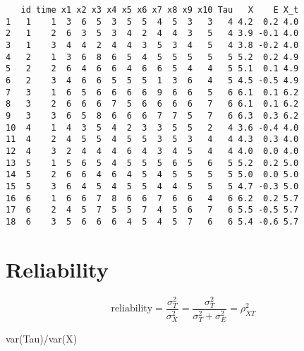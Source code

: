 \documentclass[
]{book}
\newenvironment{Shaded}{\begin{snugshade}}{\end{snugshade}}
\newcommand{\FunctionTok}[1]{\textcolor[rgb]{0.00,0.00,0.00}{#1}}
\newcommand{\NormalTok}[1]{#1}
\newcommand{\OtherTok}[1]{\textcolor[rgb]{0.56,0.35,0.01}{#1}}
\newcommand{\SpecialCharTok}[1]{\textcolor[rgb]{0.00,0.00,0.00}{#1}}
\begin{document}
\begin{verbatim}
   id time x1 x2 x3 x4 x5 x6 x7 x8 x9 x10 Tau   X    E X_t
1   1    1  3  6  5  3  5  5  4  5  3   3   4 4.2  0.2 4.0
2   1    2  6  3  5  3  4  2  4  4  3   5   4 3.9 -0.1 4.0
3   1    3  4  4  2  4  4  3  5  3  4   5   4 3.8 -0.2 4.0
4   2    1  3  6  8  6  5  4  5  5  5   5   5 5.2  0.2 4.9
5   2    2  6  4  6  6  4  6  6  5  4   4   5 5.1  0.1 4.9
6   2    3  4  6  6  5  5  5  1  3  6   4   5 4.5 -0.5 4.9
7   3    1  6  5  6  6  6  6  9  6  6   5   6 6.1  0.1 6.2
8   3    2  6  6  6  7  5  6  6  6  6   7   6 6.1  0.1 6.2
9   3    3  6  5  8  6  6  6  7  7  5   7   6 6.3  0.3 6.2
10  4    1  4  3  5  4  2  3  3  5  5   2   4 3.6 -0.4 4.0
11  4    2  4  5  5  4  5  5  3  5  3   4   4 4.3  0.3 4.0
12  4    3  2  4  4  4  6  4  3  4  5   4   4 4.0  0.0 4.0
13  5    1  5  6  5  4  5  5  5  6  5   6   5 5.2  0.2 5.0
14  5    2  6  6  4  6  4  5  4  5  5   5   5 5.0  0.0 5.0
15  5    3  6  4  5  4  5  5  4  4  5   5   5 4.7 -0.3 5.0
16  6    1  6  6  7  8  6  6  7  6  6   4   6 6.2  0.2 5.7
17  6    2  4  5  7  5  5  7  4  5  6   7   6 5.5 -0.5 5.7
18  6    3  5  6  6  6  4  5  4  5  7   6   6 5.4 -0.6 5.7
\end{verbatim}

\hypertarget{reliability}{%
\section{Reliability}\label{reliability}}

\[
\text{reliability} = \frac{\sigma^2_T}{\sigma^2_X} = \frac{\sigma^2_T}{\sigma^2_T + \sigma^2_E} = \rho^2_{XT}
\]

\begin{Shaded}
\end{Shaded}

\begin{Shaded}
\begin{Highlighting}[]
\FunctionTok{var}\NormalTok{(Tau)}\SpecialCharTok{/}\FunctionTok{var}\NormalTok{(X)}
\end{Highlighting}
\end{Shaded}
\end{document}
